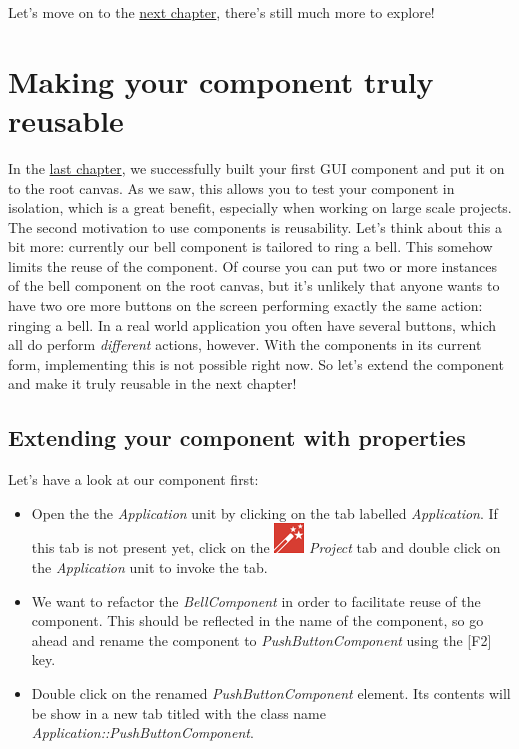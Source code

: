 \documentclass[
  a4paper,
,tablecaptionabove
]{scrbook}
\begin{document}
Let's move on to the \href{:ComponentReusability.xml}{next chapter},
there's still much more to explore!

\chapter{Making your component truly reusable}


In the \href{:FirstComponent.xml}{last chapter}, we successfully built
your first GUI component and put it on to the root canvas. As we saw,
this allows you to test your component in isolation, which is a great
benefit, especially when working on large scale projects. The second
motivation to use components is reusability. Let's think about this a
bit more: currently our bell component is tailored to ring a bell. This
somehow limits the reuse of the component. Of course you can put two or
more instances of the bell component on the root canvas, but it's
unlikely that anyone wants to have two ore more buttons on the screen
performing exactly the same action: ringing a bell. In a real world
application you often have several buttons, which all do perform
\emph{different} actions, however. With the components in its current
form, implementing this is not possible right now. So let's extend the
component and make it truly reusable in the next chapter!


\hypertarget{_extending_your_component_with_properties}{%
\section{Extending your component with
properties}\label{_extending_your_component_with_properties}}

Let's have a look at our component first:

\begin{itemize}
\item
  Open the the \emph{Application} unit by clicking on the tab labelled
  \emph{Application}. If this tab is not present yet, click on the
  \includegraphics{./../asciidoc/modules/ROOT/assets/images/icons/EmbeddedWizardIcon.png}
  \emph{Project} tab and double click on the \emph{Application} unit to
  invoke the tab.
\item
  We want to refactor the \emph{BellComponent} in order to facilitate
  reuse of the component. This should be reflected in the name of the
  component, so go ahead and rename the component to
  \emph{PushButtonComponent} using the {[}F2{]} key.
\item
  Double click on the renamed \emph{PushButtonComponent} element. Its
  contents will be show in a new tab titled with the class name
  \emph{Application::PushButtonComponent}.
\end{itemize}
\end{document}
